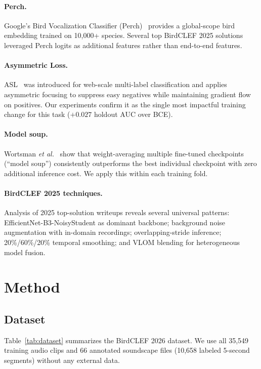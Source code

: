 \documentclass[10pt,twocolumn]{article}
\newcommand{\etal}{\emph{et al.}\xspace}
\newcommand{\tabref}[1]{Table~\ref{#1}}
\begin{document}
\paragraph{Perch.}
Google's Bird Vocalization Classifier (Perch)~\cite{hamer2024perch} provides
a global-scope bird embedding trained on 10,000+ species.
Several top BirdCLEF 2025 solutions leveraged Perch logits as additional
features rather than end-to-end features.

\paragraph{Asymmetric Loss.}
ASL~\cite{ridnik2021asl} was introduced for web-scale multi-label
classification and applies asymmetric focusing to suppress easy negatives
while maintaining gradient flow on positives.
Our experiments confirm it as the single most impactful training change
for this task ($+0.027$ holdout AUC over BCE).

\paragraph{Model soup.}
Wortsman \etal~\cite{wortsman2022soup} show that weight-averaging multiple
fine-tuned checkpoints (``model soup'') consistently outperforms the best
individual checkpoint with zero additional inference cost.
We apply this within each training fold.

\paragraph{BirdCLEF 2025 techniques.}
Analysis of 2025 top-solution writeups reveals several universal patterns:
EfficientNet-B3-NoisyStudent as dominant backbone;
background noise augmentation with in-domain recordings;
overlapping-stride inference;
20\%/60\%/20\% temporal smoothing; and
VLOM blending for heterogeneous model fusion.

\section{Method}
\label{sec:method}

\subsection{Dataset}
\label{sec:dataset}

\tabref{tab:dataset} summarizes the BirdCLEF 2026 dataset.
We use all 35,549 training audio clips and 66 annotated soundscape files
(10,658 labeled 5-second segments) without any external data.
\end{document}
